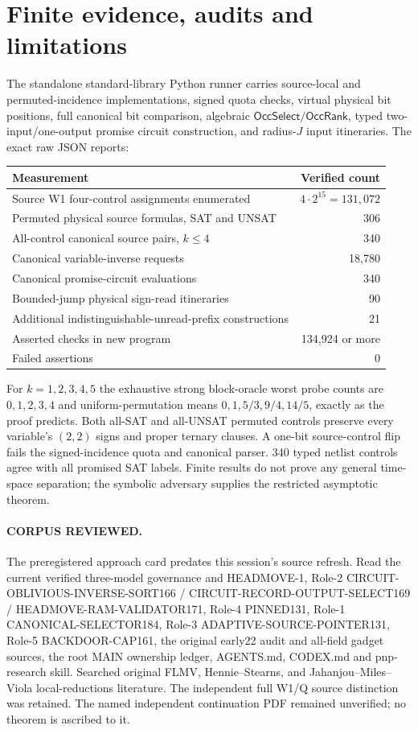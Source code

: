 \documentclass[11pt]{article}
\newcommand{\Sel}{\mathsf{OccSelect}}
\newcommand{\Rank}{\mathsf{OccRank}}
\begin{document}
\section{Finite evidence, audits and limitations}
The standalone standard-library Python runner carries source-local and permuted-incidence implementations, signed quota checks, virtual physical bit positions, full canonical bit comparison, algebraic $\Sel/\Rank$, typed two-input/one-output promise circuit construction, and radius-$J$ input itineraries. The exact raw JSON reports:
\begin{center}\small
\begin{tabular}{lr}
\toprule
Measurement & Verified count\\\midrule
Source W1 four-control assignments enumerated & $4\cdot 2^{15}=131{,}072$\\
Permuted physical source formulas, SAT and UNSAT & 306\\
All-control canonical source pairs, $k\le4$ & 340\\
Canonical variable-inverse requests & 18,780\\
Canonical promise-circuit evaluations & 340\\
Bounded-jump physical sign-read itineraries & 90\\
Additional indistinguishable-unread-prefix constructions & 21\\
Asserted checks in new program & 134,924 or more\\
Failed assertions & 0\\\bottomrule
\end{tabular}
\end{center}
For $k=1,2,3,4,5$ the exhaustive strong block-oracle worst probe counts are $0,1,2,3,4$ and uniform-permutation means $0,1,5/3,9/4,14/5$, exactly as the proof predicts. Both all-SAT and all-UNSAT permuted controls preserve every variable's $(2,2)$ signs and proper ternary clauses. A one-bit source-control flip fails the signed-incidence quota and canonical parser. 340 typed netlist controls agree with all promised SAT labels. Finite results do not prove any general time-space separation; the symbolic adversary supplies the restricted asymptotic theorem.

\paragraph{CORPUS REVIEWED.}
The preregistered approach card predates this session's source refresh. Read the current verified three-model governance and HEADMOVE-1, Role-2 CIRCUIT-OBLIVIOUS-INVERSE-SORT166 / CIRCUIT-RECORD-OUTPUT-SELECT169 / HEADMOVE-RAM-VALIDATOR171, Role-4 PINNED131, Role-1 CANONICAL-SELECTOR184, Role-3 ADAPTIVE-SOURCE-POINTER131, Role-5 BACKDOOR-CAP161, the original early22 audit and all-field gadget sources, the root MAIN ownership ledger, AGENTS.md, CODEX.md and pnp-research skill. Searched original FLMV, Hennie--Stearns, and Jahanjou--Miles--Viola local-reductions literature. The independent full W1/Q source distinction was retained. The named independent continuation PDF remained unverified; no theorem is ascribed to it.
\end{document}
